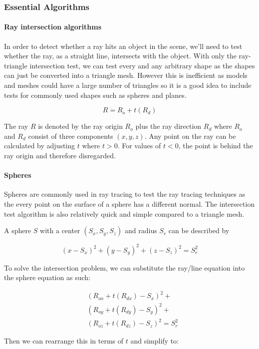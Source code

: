 \documentclass[final]{cmpreport}
\begin{document}
\subsubsection{Essential Algorithms}
\paragraph{Ray intersection algorithms} In order to detect whether a ray hits an object in the scene, we'll need to test whether the ray, as a straight line, intersects with the object. With only the ray-triangle intersection test, we can test every and any arbitrary shape as the shapes can just be converted into a triangle mesh. However this is inefficient as models and meshes could have a large number of triangles so it is a good idea to include tests for commonly used shapes such as spheres and planes.

\[ R = R_o + t(R_d) \]

The ray \( R \) is denoted by the ray origin \( R_o \) plus the ray direction \( R_d \) where \(R_o\) and \(R_d\) consist of three components \((x, y, z)\). Any point on the ray can be calculated by adjusting \(t\) where \(t > 0 \). For values of \(t < 0\), the point is behind the ray origin and therefore disregarded.

\paragraph{Spheres} \citep{linesphereintersect} Spheres are commonly used in ray tracing to test the ray tracing techniques as the every point on the surface of a sphere has a different normal. The intersection test algorithm is also relatively quick and simple compared to a triangle mesh.

A sphere \(S\) with a center \((S_x, S_y, S_z)\) and radius \(S_r\) can be described by

\[(x - S_x)^2 + (y - S_y)^2 + (z - S_z)^2 = S_r^2\]

To solve the intersection problem, we can substitute the ray/line equation into the sphere equation as such:

\begin{align}
    &(R_{ox} + t(R_{dx}) - S_x)^2 + \\
    &(R_{oy} + t(R_{dy}) - S_y)^2 + \\
    &(R_{oz} + t(R_{dz}) - S_z)^2 = S_r^2 
\end{align}

Then we can rearrange this in terms of \(t\) and simplify to:
\end{document}
